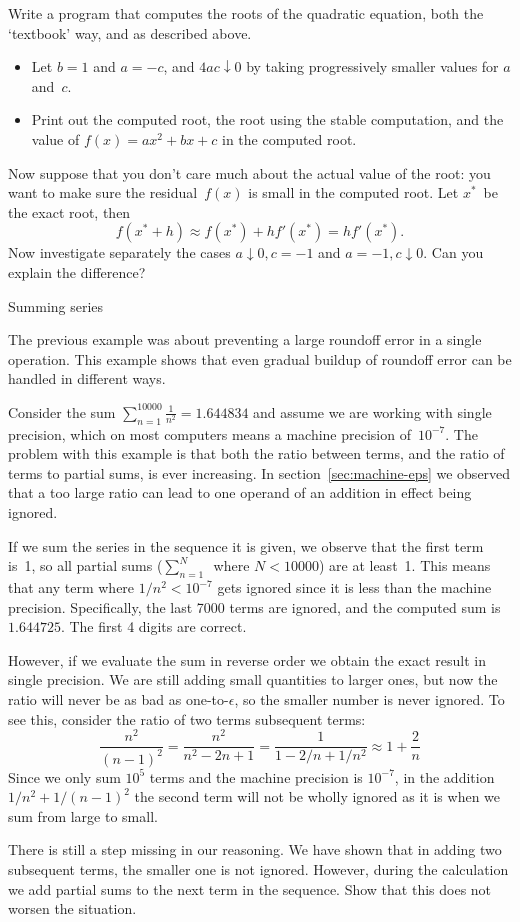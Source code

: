 \begin{exercise}
  Write a program that computes the roots of the quadratic equation, both
  the `textbook' way, and as described above. 
  \begin{itemize}
  \item Let $b=1$ and $a=-c$, and $4ac\downarrow 0$ by taking progressively smaller
    values for $a$ and~$c$.
  \item Print out the computed root, the root using the stable computation,
    and the value of $f(x)=ax^2+bx+c$ in the computed root.
  \end{itemize}
  Now suppose that you don't care much about the actual value of the root:
  you want to make sure the residual~$f(x)$ is small in the computed root.
  Let $x^*$~be the exact root, then
  \[ f(x^*+h)\approx f(x^*)+hf'(x^*) = hf'(x^*). \]
  Now investigate separately the cases $a\downarrow 0,c=-1$ and $a=-1,c\downarrow0$.
  Can you explain the difference?
\end{exercise}

 {Summing series}
\label{sec:fp-summing}

The previous example was about preventing a large roundoff error in a
single operation. This example shows that even gradual buildup of
roundoff error can be handled in different ways.

Consider the sum $\sum_{n=1}^{10000}\frac{1}{n^2}=1.644834$
and assume we are working with single precision, which on most computers
means a machine precision of~$10^{-7}$. The problem with this example
is that both the ratio between terms, and the ratio of terms to
partial sums, is ever increasing. In section~\ref{sec:machine-eps} we
observed that a too large ratio can lead to one operand of an addition in
effect being ignored.

If we sum the series in the sequence it is given, we observe that
the first term is~1, so all partial sums ($\sum_{n=1}^N$~where $N<10000$)
are at least~1. This means that any term where $1/n^2<10^{-7}$ gets
ignored since it is less than the machine precision.
Specifically, the last 7000 terms are ignored, and
the computed sum is~$1.644725$. The first 4 digits are correct.

However, if we evaluate the sum in reverse order
we obtain the exact result in single precision. We are still adding
small quantities to larger ones, but now the ratio will never be as
bad as one-to-$\epsilon$, so the smaller number is never ignored.
To see this,
consider the ratio of two terms subsequent terms:
\[ \frac{n^2}{(n-1)^2}=\frac{n^2}{n^2-2n+1}=\frac1{1-2/n+1/n^2}
    \approx 1+\frac2n
\]
Since we only sum $10^5$ terms and the machine precision is $10^{-7}$, 
in the addition $1/n^2+1/(n-1)^2$ the second term will not be wholly
ignored as it is when we sum from large to small.
\begin{exercise}
  There is still a step missing in our reasoning. We have shown that
  in adding two subsequent terms, the smaller one is not
  ignored. However, during the calculation we add partial sums to the
  next term in the sequence. Show that this does not worsen the situation.
\end{exercise}


